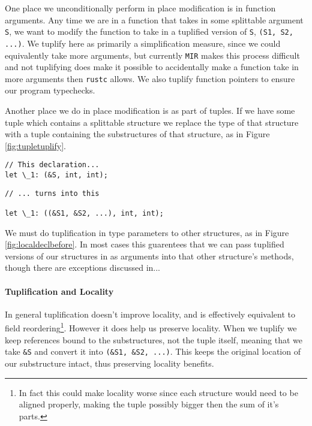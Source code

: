 \documentclass[12pt,oneside]{book}
\newcommand{\rustcname}{{\texttt{rustc}}}
\def \rustc {\rustcname{}\xspace}
\newcommand{\mirname}{{\texttt{MIR}}}
\def \mir {\mirname{}\xspace}
\begin{document}
One place we unconditionally perform in place modification is in function
arguments. Any time we are in a function that takes in some splittable
argument \texttt{S}, we want to modify the function to take 
in a tuplified version of \texttt{S}, \texttt{(S1, S2, ...)}. 
We tuplify here as primarily a simplification measure, since 
we could equivalently take more arguments, but currently
\mir makes this process difficult and
not tuplifying does make it possible to accidentally make a function
take in more arguments then \rustc allows.
We also tuplify function pointers to ensure our program typechecks.

Another place we do in place modification is as part of tuples. If we have some
tuple which contains a splittable structure we replace the type of that
structure with a tuple containing the substructures of that structure, as 
in Figure \ref{fig:tupletuplify}.

\begin{figure*}[p]
  \begin{minipage}[t]{0.5\linewidth}
\begin{verbatim}
// This declaration...
let \_1: (&S, int, int);
\end{verbatim}
  \end{minipage}
  \begin{minipage}[t]{0.5\linewidth}
\begin{verbatim}
// ... turns into this

let \_1: ((&S1, &S2, ...), int, int);
\end{verbatim}
  \end{minipage}
  \caption{Tuple Modification}
  \label{fig:tupletuplify}
\end{figure*}

We must do tuplification in type parameters to other structures,
as in Figure \ref{fig:localdeclbefore}.
In most cases this guarentees that we can pass tuplified versions 
of our structures in as
arguments into that other structure's methods, though there are exceptions
discussed in... 

\paragraph{Tuplification and Locality}
In general tuplification
doesn't improve locality, and is effectively equivalent to 
field reordering\footnote{In fact this could make locality worse since each
structure would need to be aligned properly, making the tuple possibly
bigger then the sum of it's parts.}. However it does help us preserve locality.
When we tuplify we keep references bound to the substructures, not the
tuple itself, meaning that we take \texttt{\&S} and convert it into 
\texttt{(\&S1, \&S2, ...)}. This keeps the original location of our 
substructure intact, thus preserving locality benefits.
\end{document}
